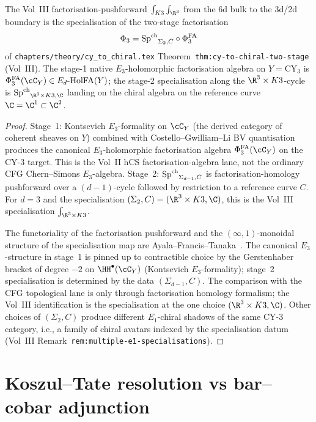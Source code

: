 \begin{theorem}
\label{thm:cfg-row-15}
The Vol~III factorisation-pushforward
$\int_{K3}\int_{\R^3}$ from the 6d bulk to the 3d/2d boundary is the
specialisation of
the two-stage factorisation
\[
 \Phi_3 = {\mathrm{Sp}^{\mathrm{ch}}}_{\Sigma_2, C}\circ \Phi^{\mathrm{FA}}_3
\]
of
\texttt{chapters/theory/cy\_to\_chiral.tex}
Theorem~\texttt{thm:cy-to-chiral-two-stage} (Vol~III). The stage-1
native $E_3$-holomorphic factorisation algebra on $Y = \mathrm{CY}_3$
is $\PhiFA_3(\cC_Y)\in\EdHolFA(Y)$; the stage-2 specialisation along the
$\R^3\times K3$-cycle is
${\SpCh}_{\R^3\times K3, \C}$ landing on the chiral algebra on the
reference curve $\C = \C^1\subset\C^2$.
\end{theorem}

\begin{proof}
Stage~1: Kontsevich $E_3$-formality on $\cC_Y$ (the derived category
of coherent sheaves on $Y$) combined with Costello--Gwilliam--Li BV
quantisation produces the canonical $E_3$-holomorphic factorisation
algebra $\PhiFA_3(\cC_Y)$ on the CY-$3$ target. This is the Vol~II hCS
factorisation-algebra lane, not the ordinary CFG Chern--Simons
$E_3$-algebra. Stage~2:
${\mathrm{Sp}^{\mathrm{ch}}}_{\Sigma_{d-1}, C}$ is factorisation-homology pushforward over
a $(d-1)$-cycle followed by restriction to a reference curve $C$. For
$d = 3$ and the specialisation $(\Sigma_2, C) = (\R^3\times K3, \C)$,
this is the Vol~III specialisation $\int_{\R^3\times K3}$.

The functoriality of the factorisation pushforward and the
$(\infty,1)$-monoidal structure of the specialisation map are
Ayala--Francis--Tanaka~\cite[Thm.~4.1.3]{AyalaFrancisTanaka2017}. The
canonical $E_3$-structure in stage~1 is pinned up to contractible
choice by the Gerstenhaber bracket of degree $-2$ on $\HH^\bullet(\cC_Y)$
(Kontsevich $E_3$-formality); stage~2 specialisation is determined
by the data $(\Sigma_{d-1}, C)$. The comparison with the CFG
topological lane is only through factorisation homology formalism; the
Vol~III identification is the specialisation at the one choice
$(\R^3\times K3, \C)$. Other choices
of $(\Sigma_2, C)$ produce different $E_1$-chiral shadows of the same
CY-$3$ category, i.e., a family of chiral avatars indexed by the
specialisation datum (Vol~III Remark~\texttt{rem:multiple-e1-specialisations}).
\end{proof}

\section{Koszul--Tate resolution vs bar--cobar adjunction}
\label{sec:cfg-kt-bar-cobar}

